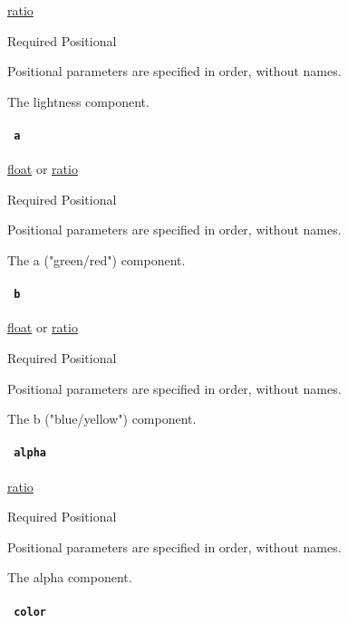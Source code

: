 \href{/docs/reference/layout/ratio/}{ratio}

{Required} {{ Positional }}

\label{definitions-oklab-lightness-positional-tooltip}
Positional parameters are specified in order, without names.

The lightness component.

\paragraph{\texorpdfstring{\texttt{\ a\ }}{ a }}\label{definitions-oklab-a}

\href{/docs/reference/foundations/float/}{float} {or}
\href{/docs/reference/layout/ratio/}{ratio}

{Required} {{ Positional }}

\label{definitions-oklab-a-positional-tooltip}
Positional parameters are specified in order, without names.

The a ("green/red") component.

\paragraph{\texorpdfstring{\texttt{\ b\ }}{ b }}\label{definitions-oklab-b}

\href{/docs/reference/foundations/float/}{float} {or}
\href{/docs/reference/layout/ratio/}{ratio}

{Required} {{ Positional }}

\label{definitions-oklab-b-positional-tooltip}
Positional parameters are specified in order, without names.

The b ("blue/yellow") component.

\paragraph{\texorpdfstring{\texttt{\ alpha\ }}{ alpha }}\label{definitions-oklab-alpha}

\href{/docs/reference/layout/ratio/}{ratio}

{Required} {{ Positional }}

\label{definitions-oklab-alpha-positional-tooltip}
Positional parameters are specified in order, without names.

The alpha component.

\paragraph{\texorpdfstring{\texttt{\ color\ }}{ color }}\label{definitions-oklab-color}

